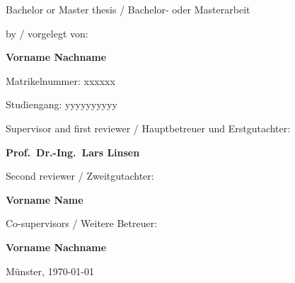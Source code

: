 \begin{centering}
{\large
	Bachelor or Master thesis / Bachelor- oder Masterarbeit  \\[2cm]
}

{\large
	by / vorgelegt von:
}

{ \Large
	\textbf{Vorname Nachname}\\[0.5cm]
}

{\large
	Matrikelnummer: xxxxxx\\[2mm]
}

{\large
	Studiengang: yyyyyyyyyy \\[2cm]
}
    
{\large
	Supervisor and first reviewer / Hauptbetreuer und Erstgutachter:
}

{\Large
	\textbf{Prof.~Dr.-Ing.~Lars Linsen}\\[0.5cm]
}

{\large
	Second reviewer / Zweitgutachter:
}

{\Large
	\textbf{Vorname Name}\\[0.5cm]
}
                               
{\large
	Co-supervisors / Weitere Betreuer:
}

{\Large
	\textbf{Vorname Nachname}\\[2.5cm]
}

{\large
Münster, \today \\[1.5cm]
}


\end{centering}